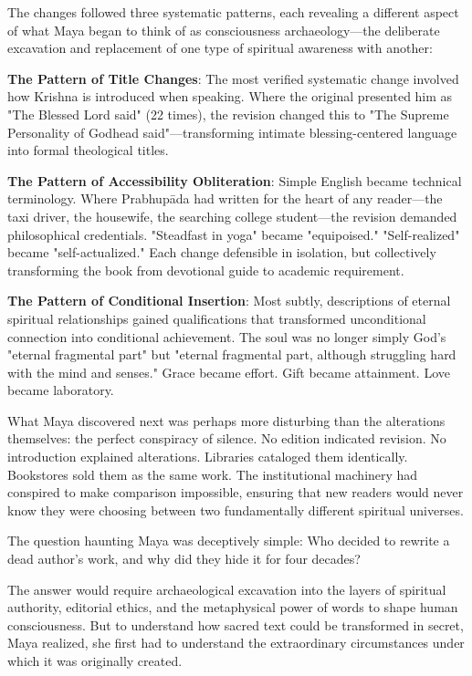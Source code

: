 \documentclass[12pt,twoside]{book}
\begin{document}
The changes followed three systematic patterns, each revealing a different aspect of what Maya began to think of as consciousness archaeology—the deliberate excavation and replacement of one type of spiritual awareness with another:

\textbf{\textbf{The Pattern of Title Changes}}: The most verified systematic change involved how Krishna is introduced when speaking. Where the original presented him as "The Blessed Lord said" (22 times), the revision changed this to "The Supreme Personality of Godhead said"—transforming intimate blessing-centered language into formal theological titles.

\textbf{\textbf{The Pattern of Accessibility Obliteration}}: Simple English became technical terminology. Where Prabhupāda had written for the heart of any reader—the taxi driver, the housewife, the searching college student—the revision demanded philosophical credentials. "Steadfast in yoga" became "equipoised." "Self-realized" became "self-actualized." Each change defensible in isolation, but collectively transforming the book from devotional guide to academic requirement.

\textbf{\textbf{The Pattern of Conditional Insertion}}: Most subtly, descriptions of eternal spiritual relationships gained qualifications that transformed unconditional connection into conditional achievement. The soul was no longer simply God's "eternal fragmental part" but "eternal fragmental part, although struggling hard with the mind and senses." Grace became effort. Gift became attainment. Love became laboratory.

What Maya discovered next was perhaps more disturbing than the alterations themselves: the perfect conspiracy of silence. No edition indicated revision. No introduction explained alterations. Libraries cataloged them identically. Bookstores sold them as the same work. The institutional machinery had conspired to make comparison impossible, ensuring that new readers would never know they were choosing between two fundamentally different spiritual universes.

The question haunting Maya was deceptively simple: Who decided to rewrite a dead author's work, and why did they hide it for four decades?

The answer would require archaeological excavation into the layers of spiritual authority, editorial ethics, and the metaphysical power of words to shape human consciousness. But to understand how sacred text could be transformed in secret, Maya realized, she first had to understand the extraordinary circumstances under which it was originally created.
\end{document}
